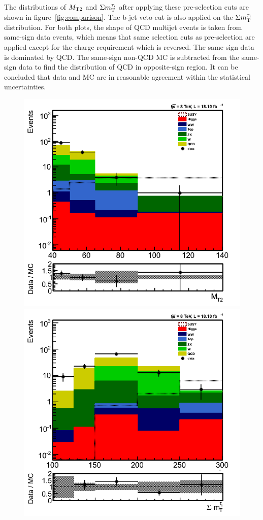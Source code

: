 The distributions of ${M_{\rm T2}}$ and $\Sigma m_{\rm T}^{\tau_i}$ after applying these pre-selection cuts are shown in figure~\ref{fig:comparison}.
The b-jet veto cut is also applied on the $\Sigma m_{\rm T}^{\tau_i}$ distribution. For both plots, the shape of QCD multijet events
is taken from same-sign data events, which means that same selection cuts as pre-selection are applied except for the charge
requirement which is reversed. The same-sign data is dominated by QCD. The same-sign non-QCD MC is subtracted from the same-sign data to
find the distribution of QCD in opposite-sign region.   
 It can be concluded that data and MC are in reasonable agreement within the statistical uncertainties.
\begin{figure}[!Hhtb]
\centering
\includegraphics[angle=0,scale=0.35]{TauTauFigs/MT2_SSQCD_dataunblinding.png}
\includegraphics[angle=0,scale=0.35]{TauTauFigs/SumMT_SSQCD_dataunblinding.png} \\

\end{figure}
